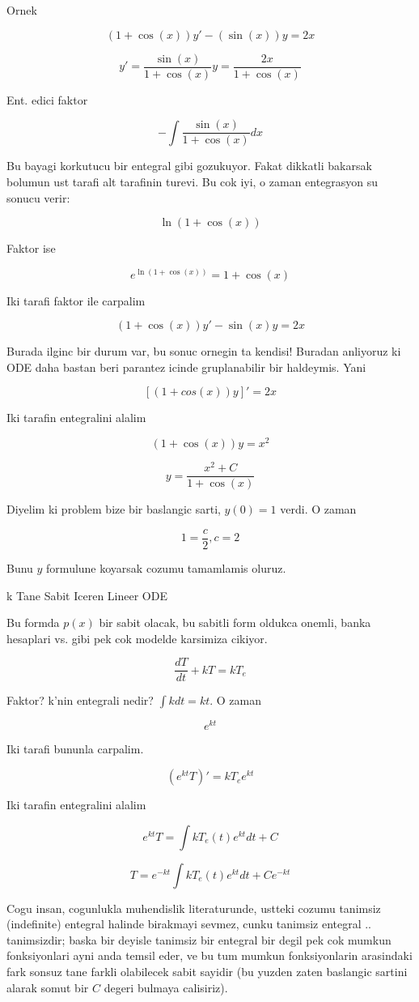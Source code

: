 \documentclass[12pt,fleqn]{article}\usepackage{../common}
\begin{document}
Ornek 

\[ (1+\cos(x))y' - (\sin(x))y = 2x \]

\[ y' = \frac{\sin(x)}{1+\cos(x)}y = \frac{2x}{1+\cos(x)} \]

Ent. edici faktor

\[ - \int \frac{\sin(x)}{1+\cos(x)} dx \]

Bu bayagi korkutucu bir entegral gibi gozukuyor. Fakat dikkatli
bakarsak bolumun ust tarafi alt tarafinin turevi. Bu cok iyi, o zaman
entegrasyon su sonucu verir:

\[ \ln (1+\cos(x)) \]

Faktor ise

\[ e^{\ln (1+\cos(x))} = 1+\cos(x) \]

Iki tarafi faktor ile carpalim

\[ (1+\cos(x)) y' - \sin(x)y = 2x \]

Burada ilginc bir durum var, bu sonuc ornegin ta kendisi! Buradan
anliyoruz ki ODE daha bastan beri parantez icinde gruplanabilir bir
haldeymis. Yani

\[ [(1+cos(x))y]' = 2x \]

Iki tarafin entegralini alalim

\[ (1+\cos(x))y = x^2 \]

\[ y = \frac{x^2+C}{1+\cos(x)} \]

Diyelim ki problem bize bir baslangic sarti, $y(0) = 1$ verdi. O zaman

\[ 1=\frac{c}{2}, c=2 \]

Bunu $y$ formulune koyarsak cozumu tamamlamis oluruz. 

k Tane Sabit Iceren Lineer ODE

Bu formda $p(x)$ bir sabit olacak, bu sabitli form oldukca onemli,
banka hesaplari vs. gibi pek cok modelde karsimiza cikiyor.

\[ \frac{dT}{dt} + kT = kT_e \]

Faktor? k'nin entegrali nedir? $\int k dt = kt$. O zaman

\[ e^{kt} \]

Iki tarafi bununla carpalim. 

\[ (e^{kt} T)' = kT_e e^{kt} \]

Iki tarafin entegralini alalim

\[ e^{kt} T = \int kT_e(t) e^{kt}dt + C\]

\[ T = e^{-kt} \int kT_e(t) e^{kt} dt + C e^{-kt} \]

Cogu insan, cogunlukla muhendislik literaturunde, ustteki cozumu
tanimsiz (indefinite) entegral halinde birakmayi sevmez, cunku
tanimsiz entegral .. tanimsizdir; baska bir deyisle tanimsiz bir
entegral bir degil pek cok mumkun fonksiyonlari ayni anda temsil eder,
ve bu tum mumkun fonksiyonlarin arasindaki fark sonsuz tane farkli
olabilecek sabit sayidir (bu yuzden zaten baslangic sartini alarak
somut bir $C$ degeri bulmaya calisiriz). 
\end{document}
